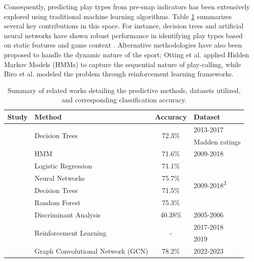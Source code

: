 \documentclass[runningheads]{llncs}
\begin{document}
Consequently, predicting play types from pre-snap indicators has been extensively explored using traditional machine learning algorithms. Table \ref{table:ref_summary} summarizes several key contributions in this space. For instance, decision trees and artificial neural networks have shown robust performance in identifying play types based on static features and game context \cite{Fernandes2020,Teich2016,Goyal2020}. Alternative methodologies have also been proposed to handle the dynamic nature of the sport; Otting et al. \cite{Otting2021} applied Hidden Markov Models (HMMs) to capture the sequential nature of play-calling, while Biro et al. \cite{Biro2022} modeled the problem through reinforcement learning frameworks.

\begin{table}[h]
    \centering
    \caption{Summary of related works detailing the predictive methods, datasets utilized, and corresponding classification accuracy.}
    \label{table:ref_summary}
    \begin{tabular}{c|p{4.5cm}|c|p{3.5cm}}
        \hline
        \textbf{Study} & \textbf{Method} & \textbf{Accuracy} & \textbf{Dataset} \\ 
        \hline
        \multirow{2}{*}{\cite{Fernandes2020}} & \multirow{2}{*}{Decision Trees} & \multirow{2}{*}{72.3\%} & 2013-2017\tablefootnote{\url{www.nflsavant.com}} \\ 
         & & & Madden ratings\tablefootnote{\url{www.maddenratings.weebly.com}} \\  
        \hline
        \cite{Otting2021} & HMM & 71.6\% & 2009-2018 \tablefootnote{\url{www.kaggle.com}} \\ 
        \hline
        \multirow{4}{*}{\cite{Goyal2020}} & Logistic Regression & 71.1\% & \multirow{4}{*}{2009-2018\textsuperscript{3}} \\ 
            & Neural Networks & 75.7\% & \\
            & Decision Trees & 71.5\% & \\
            & Random Forest & 75.3\% & \\
        \hline
        \cite{Heiny2011} & Discriminant Analysis & 40.38\% & 2005-2006\tablefootnote{\url{www.footballoutsiders.com}} \\
        \hline
        \multirow{2}{*}{\cite{Biro2022}} & \multirow{2}{*}{Reinforcement Learning} & \multirow{2}{*}{-} & 2017-2018\tablefootnote{\url{www.github.com/maksimhorowitz/nflscrapR}} \\
         & & & 2019 \tablefootnote{\url{www.espn.com/nfl/stats}} \\
        \hline
        \cite{souza2025nfl} & Graph Convolutional Network (GCN) & 78.2\% & 2022-2023\tablefootnote{\url{www.kaggle.com/competitions/nfl-big-data-bowl-2025}} \\
        \hline
    \end{tabular}
\end{table}
\end{document}
